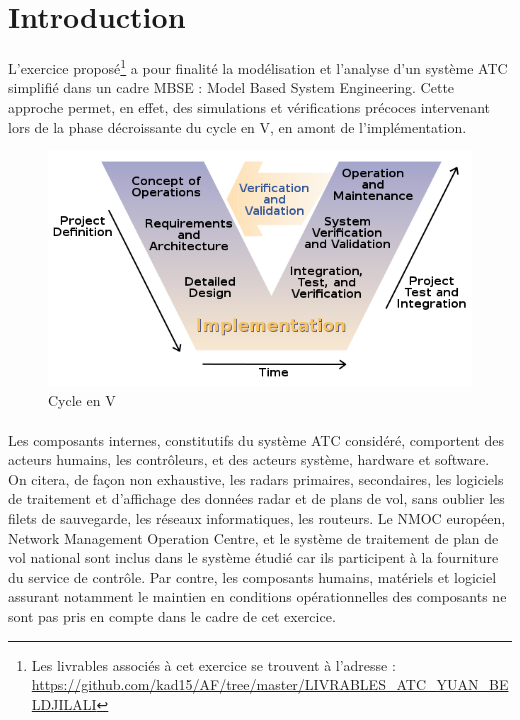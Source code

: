 
\pagebreak

\section*{Introduction}



L'exercice proposé\footnote{Les livrables associés à cet exercice se trouvent à l'adresse : 
	\url{https://github.com/kad15/AF/tree/master/LIVRABLES_ATC_YUAN_BELDJILALI}} a pour finalité la modélisation et l'analyse d'un système ATC simplifié dans un cadre MBSE : Model Based System Engineering. Cette approche permet, en effet, des simulations et vérifications précoces intervenant lors de la phase décroissante du cycle en V, en amont de l'implémentation.   

\begin{figure}[H]
	\begin{center}	
		\includegraphics[scale=0.50]{images/v.png}
		\caption{Cycle en V}
		\label{v}
	\end{center}
\end{figure}

\paragraph{}
Les composants internes, constitutifs du système ATC considéré, comportent des acteurs humains, les contrôleurs, et des acteurs système, hardware et software. On citera, de façon non exhaustive, les radars primaires, secondaires, les logiciels de traitement et d'affichage des données radar et de plans de vol, sans oublier les filets de sauvegarde, les réseaux informatiques, les routeurs. Le NMOC européen, Network Management Operation Centre, et le système de traitement de plan de vol national sont inclus dans le système étudié car ils participent à la fourniture du service de contrôle. Par contre, les composants humains, matériels et logiciel assurant notamment le maintien en conditions opérationnelles des composants ne sont pas pris en compte dans le cadre de cet exercice.
